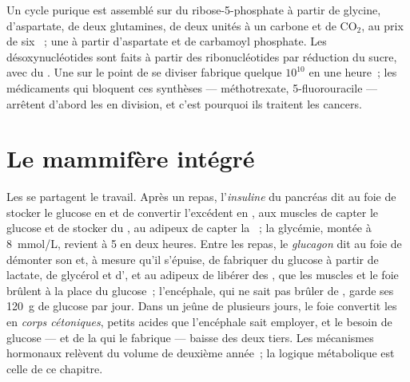 \begin{example}\label{ex:b1:biosyntheses-integration:nucleotides}
Un cycle purique est assemblé sur du ribose-5-phosphate à partir de
glycine, d'aspartate, de deux glutamines, de deux unités à un carbone et
de $\mathrm{CO_2}$, au prix de six ~; une  à partir
d'aspartate et de carbamoyl phosphate. Les désoxynucléotides sont faits
à partir des ribonucléotides par réduction du sucre, avec du . Une
 sur le point de se diviser fabrique quelque $10^{10}$
 en une heure~; les médicaments qui bloquent ces synthèses
--- méthotrexate, 5-fluorouracile --- arrêtent d'abord les  en
division, et c'est pourquoi ils traitent les cancers.
\end{example}

\section{Le mammifère intégré}

\begin{proposition}\label{prop:b1:biosyntheses-integration:fedfasting}
Les  se partagent le travail. Après un repas, l'\emph{insuline}
du pancréas dit au foie de stocker le glucose en  et de
convertir l'excédent en , aux muscles de capter le glucose et de
stocker du , au  adipeux de capter la ~; la
glycémie, montée à \qty{8}{mmol/L}, revient à \qty{5}{} en deux heures.
Entre les repas, le \emph{glucagon} dit au foie de démonter son
 et, à mesure qu'il s'épuise, de fabriquer du glucose à partir
de lactate, de glycérol et d', et au  adipeux de
libérer des , que les muscles et le foie brûlent à la place
du glucose~; l'encéphale, qui ne sait pas brûler de , garde ses
\qty{120}{g} de glucose par jour. Dans un jeûne de plusieurs jours, le
foie convertit les  en \emph{corps cétoniques}, petits acides
que l'encéphale sait employer, et le besoin de glucose --- et de la
 qui le fabrique --- baisse des deux tiers. Les mécanismes
hormonaux relèvent du volume de deuxième année~; la logique métabolique
est celle de ce chapitre.
\end{proposition}

